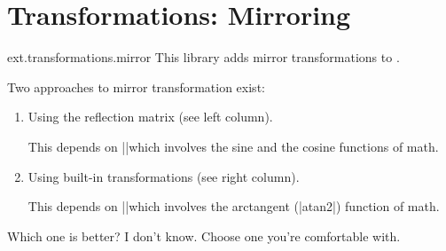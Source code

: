 %
%
%

\section{Transformations: Mirroring}
\label{pgflibrary:transformations}

\begin{purepgflibrary}{ext.transformations.mirror}
  This library adds mirror transformations to \pgfname.
\end{purepgflibrary}

Two approaches to mirror transformation exist:
\begin{enumerate}
\item Using the reflection matrix (see left column).

  This depends on |\pgfpointnormalised|\indexCommandO\pgfpointnormalised which involves
  the sine and the cosine functions of \pgfname math.

\item Using built-in transformations (see right column).

  This depends on |\pgfmathanglebetween|\indexCommandO\pgfmathanglebetween which
  involves the arctangent (|atan2|) function of \pgfname math.
\end{enumerate}

Which one is better? I don't know.
Choose one you're comfortable with.

